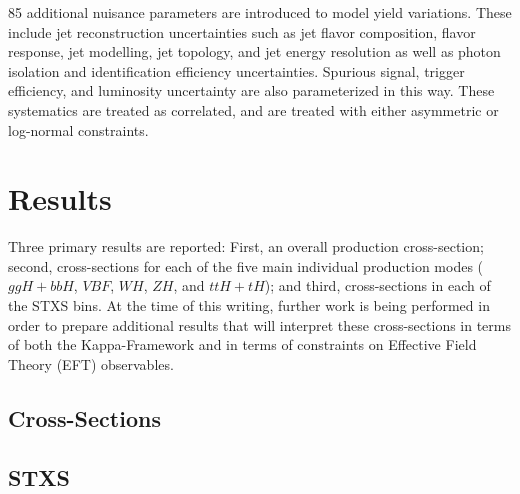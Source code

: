85 additional nuisance parameters are introduced to model yield variations. These include jet reconstruction uncertainties such as jet flavor composition, flavor response, jet modelling, jet topology, and jet energy resolution as well as photon isolation and identification efficiency uncertainties. Spurious signal, trigger efficiency, and luminosity uncertainty are also parameterized in this way. These systematics are treated as correlated, and are treated with either asymmetric or log-normal constraints.


\section{Results} \label{sec:Results}

Three primary results are reported: First, an overall production cross-section; second, cross-sections for each of the five main individual production modes ($ggH+bbH$, $VBF$, $WH$, $ZH$, and $ttH+tH$); and third, cross-sections in each of the STXS bins. At the time of this writing, further work is being performed in order to prepare additional results that will interpret these cross-sections in terms of both the Kappa-Framework and in terms of constraints on Effective Field Theory (EFT) observables.

\subsection{Cross-Sections} \label{sec:Xsecs}




\subsection{STXS} \label{sec:STXS}



